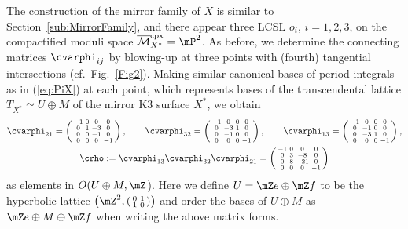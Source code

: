 \documentclass[pdftex]{sigma}
\numberwithin{equation}{section}
\begin{document}
The construction of the mirror family of $X$ is similar to Section~\ref{sub:MirrorFamily}, and there appear three LCSL $o_{i}$, $i=1,2,3$, on the compactified moduli space $\overline{\mathcal{M}}_{X^{*}}^{\rm cpx}=\mP^{2}$. As before, we determine the connecting matrices $\cvarphi_{ij}$ by blowing-up at three points with (fourth) tangential intersections (cf.\ Fig.~\ref{Fig2}). Making similar canonical bases of period integrals as
in (\ref{eq:PiX}) at each point, which represents bases of the transcendental lattice $T_{X^{*}}\simeq U\oplus M$ of the mirror K3 surface $X^{*}$, we obtain
\begin{gather*}
 \cvarphi_{21}=\left(\begin{smallmatrix}-1 & 0 & 0 & 0\\
0 & 1 & -3 & 0\\
0 & 0 & -1 & 0\\
0 & 0 & 0 & -1
\end{smallmatrix}\right),\qquad \cvarphi_{32}=\left(\begin{smallmatrix}-1 & 0 & 0 & 0\\
0 & -3 & 1 & 0\\
0 & -1 & 0 & 0\\
0 & 0 & 0 & -1
\end{smallmatrix}\right),\qquad \cvarphi_{13}=\left(\begin{smallmatrix}-1 & 0 & 0 & 0\\
0 & -1 & 0 & 0\\
0 & -3 & 1 & 0\\
0 & 0 & 0 & -1
\end{smallmatrix}\right),\\
\crho:=\cvarphi_{13}\cvarphi_{32}\cvarphi_{21}=\left(\begin{smallmatrix}-1 & 0 & 0 & 0\\
0 & 3 & -8 & 0\\
0 & 8 & -21 & 0\\
0 & 0 & 0 & -1
\end{smallmatrix}\right)
\end{gather*}
as elements in $O(U\oplus M,\mZ$). Here we define $U=\mZ e\oplus\mZ f$ to be the hyperbolic lattice $\left(\mZ^{2},\left(\begin{smallmatrix}0 & 1\\ 1 & 0 \end{smallmatrix}\right)\right)$ and order the bases of $U\oplus M$ as $\mZ e\oplus M\oplus\mZ f$ when writing the above matrix forms.
\end{document}

